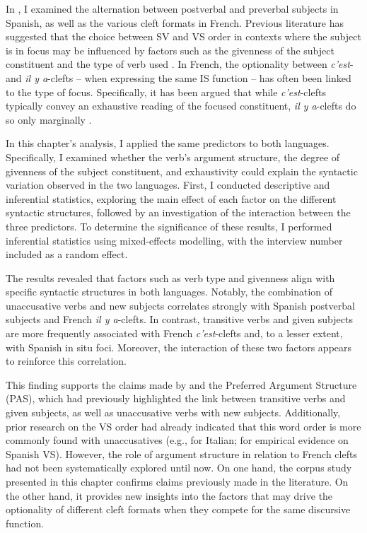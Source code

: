 In , I examined the alternation between postverbal and preverbal subjects in Spanish, as well as the various cleft formats in French. Previous literature has suggested that the choice between SV and VS order in contexts where the subject is in focus may be influenced by factors such as the givenness of the subject constituent and the type of verb used \parencite{gabriel2007fokus}. In French, the optionality between \textit{c'est}- and \textit{il y a}-clefts -- when expressing the same IS function -- has often been linked to the type of focus. Specifically, it has been argued that while \textit{c'est}-clefts typically convey an exhaustive reading of the focused constituent, \textit{il y a}-clefts do so only marginally \parencite{de2015status, karssenberg2017oiseaux}.

In this chapter's analysis, I applied the same predictors to both languages. Specifically, I examined whether the verb’s argument structure, the degree of givenness of the subject constituent, and exhaustivity could explain the syntactic variation observed in the two languages. First, I conducted descriptive and inferential statistics, exploring the main effect of each factor on the different syntactic structures, followed by an investigation of the interaction between the three predictors. To determine the significance of these results, I performed inferential statistics using mixed-effects modelling, with the interview number included as a random effect.

The results revealed that factors such as verb type and givenness align with specific syntactic structures in both languages. Notably, the combination of unaccusative verbs and new subjects correlates strongly with Spanish postverbal subjects and French \textit{il y a}-clefts. In contrast, transitive verbs and given subjects are more frequently associated with French \textit{c'est}-clefts and, to a lesser extent, with Spanish in situ foci. Moreover, the interaction of these two factors appears to reinforce this correlation.

This finding supports the claims made by \textcite{du2003preferred} and the Preferred Argument Structure (PAS), which had previously highlighted the link between transitive verbs and given subjects, as well as unaccusative verbs with new subjects. Additionally, prior research on the VS order had already indicated that this word order is more commonly found with unaccusatives (e.g., \cite{burzio1986italian} for Italian; \cite{gabriel2007fokus} for empirical evidence on Spanish VS). However, the role of argument structure in relation to French clefts had not been systematically explored until now. On one hand, the corpus study presented in this chapter confirms claims previously made in the literature. On the other hand, it provides new insights into the factors that may drive the optionality of different cleft formats when they compete for the same discursive function.

